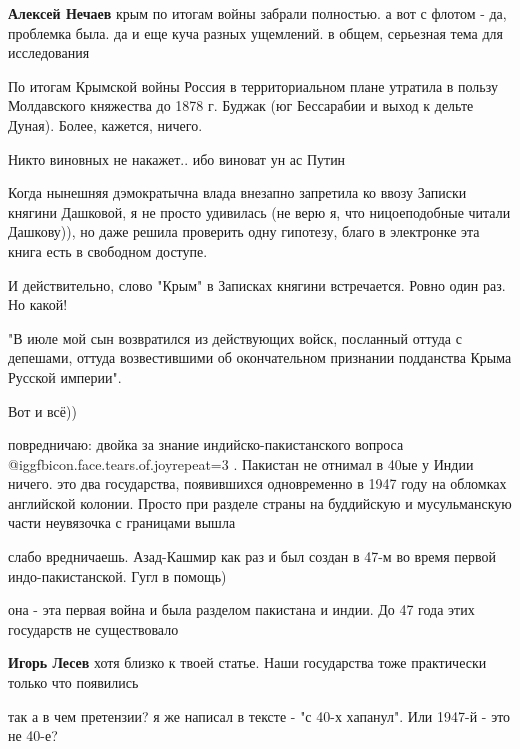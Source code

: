 \begin{itemize}
\begin{itemize}
\textbf{Алексей Нечаев} крым по итогам войны забрали полностью. а вот с флотом - да, проблемка была. да и еще куча разных ущемлений. в общем, серьезная тема для исследования


По итогам Крымской войны Россия в территориальном плане утратила в пользу
Молдавского княжества до 1878 г. Буджак (юг Бессарабии и выход к дельте Дуная).
Более, кажется, ничего.

\end{itemize} %

Никто виновных не накажет.. ибо виноват ун ас Путин


Когда нынешняя дэмократычна влада внезапно запретила ко ввозу Записки княгини
Дашковой, я не просто удивилась (не верю я, что ницоеподобные читали Дашкову)),
но даже решила проверить одну гипотезу, благо в электронке эта книга есть в
свободном доступе.

И действительно, слово "Крым" в Записках княгини встречается. Ровно один раз. Но какой!

"В июле мой сын возвратился из действующих войск, посланный оттуда с депешами,
оттуда возвестившими об окончательном признании подданства Крыма Русской
империи".

Вот и всё))


повредничаю: двойка за знание индийско-пакистанского вопроса @igg{fbicon.face.tears.of.joy}{repeat=3} . Пакистан не
отнимал в 40ые у Индии ничего. это два государства, появившихся одновременно в
1947 году на обломках английской колонии. Просто при разделе страны на
буддийскую и мусульманскую части неувязочка с границами вышла

\begin{itemize} %
слабо вредничаешь. Азад-Кашмир как раз и был создан в 47-м во время первой индо-пакистанской. Гугл в помощь)

она - эта первая война и была разделом пакистана и индии. До 47 года этих государств не существовало

\textbf{Игорь Лесев} хотя близко к твоей статье. Наши государства тоже практически только что появились

так а в чем претензии? я же написал в тексте - "с 40-х хапанул". Или 1947-й - это не 40-е?


\end{itemize}
\end{itemize}
